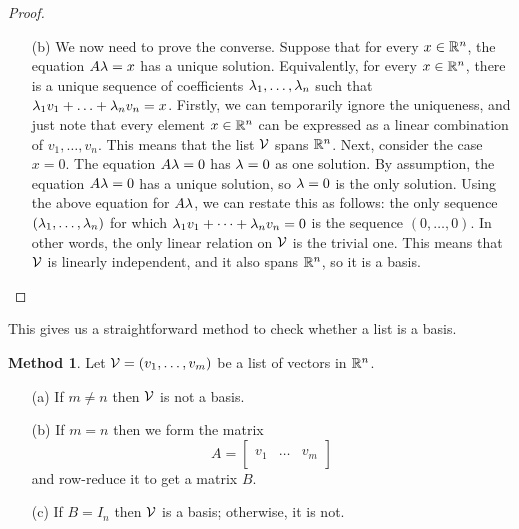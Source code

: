 \documentclass[reqno]{amsart}
\theoremstyle{definition}
\newtheorem{method}[theorem]{Method}
\begin{document}
\begin{proof}
\begin{itemize}
  \item[(b)] We now need to prove the converse.  Suppose that for
   every $x\in{\mathbb{R}}^n$, the equation $A\lambda=x$ has a unique solution.
   Equivalently, for every $x\in{\mathbb{R}}^n$, there is a unique sequence of
   coefficients $\lambda_1,\dotsc,\lambda_n$ such that
   $\lambda_1v_1+\dotsc+\lambda_nv_n=x$.  Firstly, we can temporarily ignore
   the uniqueness, and just note that every element $x\in{\mathbb{R}}^n$ can be
   expressed as a linear combination of $v_1,\dotsc,v_n$.  This means
   that the list $\mathcal{V}$ spans ${\mathbb{R}}^n$.  Next, consider the case $x=0$.
   The equation $A\lambda=0$ has $\lambda=0$ as one solution.  By assumption,
   the equation $A\lambda=0$ has a unique solution, so $\lambda=0$ is the only
   solution.  Using the above equation for $A\lambda$, we can restate this
   as follows: the only sequence $(\lambda_1,\dotsc,\lambda_n)$ for which
   $\lambda_1v_1+\dotsb+\lambda_nv_n=0$ is the sequence $(0,\dotsc,0)$.  In
   other words, the only linear relation on $\mathcal{V}$ is the trivial one.
   This means that $\mathcal{V}$ is linearly independent, and it also spans
   ${\mathbb{R}}^n$, so it is a basis.
 \end{itemize}
\end{proof}

This gives us a straightforward method to check whether a list is a
basis.
\begin{method}\label{meth-check-basis}
 Let $\mathcal{V}=(v_1,\dotsc,v_m)$ be a list of vectors in ${\mathbb{R}}^n$.
 \begin{itemize}
  \item[(a)] If $m\neq n$ then $\mathcal{V}$ is not a basis.
  \item[(b)] If $m=n$ then we form the matrix
   \[ A = \left[\begin{array}{c|c|c}
                && \\
                v_1 & \dotsc & v_m \\
                &&
              \end{array}\right]
   \]
   and row-reduce it to get a matrix $B$.
  \item[(c)] If $B=I_n$ then $\mathcal{V}$ is a basis; otherwise, it is not.
 \end{itemize}
\end{method}
\end{document}
